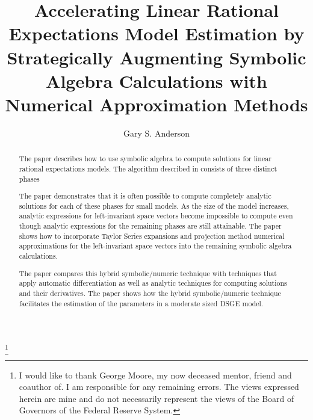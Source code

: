 \documentclass[12pt]{elsart}
\begin{document}
\begin{frontmatter}

\title{ Accelerating Linear Rational Expectations Model Estimation by
Strategically Augmenting Symbolic Algebra Calculations with Numerical Approximation Methods}

\author{Gary S. Anderson}
\thanks{I would like to thank George Moore, my now deceased mentor,
friend and coauthor of\cite{ANDER:AIM2}.
I am responsible for
any remaining errors.
The views expressed herein are mine and 
do not necessarily represent the views of the Board of Governors of the Federal
Reserve System.
}
\begin{abstract}
\noindent
The paper describes how to use symbolic algebra to compute 
solutions for linear rational expectations models.
The algorithm described in\cite{anderson10} consists of three distinct phases%

The paper demonstrates that it is often possible to 
compute completely analytic solutions for each of these phases for small models.
As the size of the model increases, analytic expressions for 
left-invariant space vectors become impossible to compute
even though analytic expressions for the
remaining phases are still attainable.
The paper shows how to incorporate Taylor Series expansions and  projection method
numerical approximations for the left-invariant space vectors
 into the remaining symbolic algebra calculations.

The paper compares this hybrid symbolic/numeric technique with techniques that
apply automatic differentiation\cite{bastani08}  as well as 
 analytic techniques for computing solutions 
and their derivatives\cite{ANDER:AIM3,zadrozny88,blake04}.
The paper shows how the hybrid symbolic/numeric technique facilitates
the estimation of the parameters in a moderate sized DSGE model.

\end{abstract}




\end{frontmatter}
\end{document}
